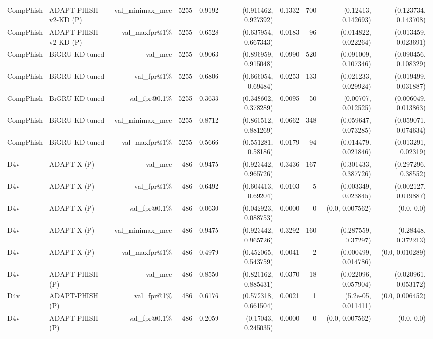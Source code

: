 \begin{table}[t]
\begin{tabular}{llrrrrrrrr}
CompPhish & ADAPT-PHISH v2-KD (P) & val\_minimax\_mcc & 5255 & 0.9192 & (0.910462, 0.927392) & 0.1332 & 700 & (0.12413, 0.142693) & (0.123734, 0.143708) \\
CompPhish & ADAPT-PHISH v2-KD (P) & val\_maxfpr@1\% & 5255 & 0.6528 & (0.637954, 0.667343) & 0.0183 & 96 & (0.014822, 0.022264) & (0.013459, 0.023691) \\
CompPhish & BiGRU-KD tuned & val\_mcc & 5255 & 0.9063 & (0.896959, 0.915048) & 0.0990 & 520 & (0.091009, 0.107346) & (0.090456, 0.108329) \\
CompPhish & BiGRU-KD tuned & val\_fpr@1\% & 5255 & 0.6806 & (0.666054, 0.69484) & 0.0253 & 133 & (0.021233, 0.029924) & (0.019499, 0.031887) \\
CompPhish & BiGRU-KD tuned & val\_fpr@0.1\% & 5255 & 0.3633 & (0.348602, 0.378289) & 0.0095 & 50 & (0.00707, 0.012525) & (0.006049, 0.013863) \\
CompPhish & BiGRU-KD tuned & val\_minimax\_mcc & 5255 & 0.8712 & (0.860512, 0.881269) & 0.0662 & 348 & (0.059647, 0.073285) & (0.059071, 0.074634) \\
CompPhish & BiGRU-KD tuned & val\_maxfpr@1\% & 5255 & 0.5666 & (0.551281, 0.58186) & 0.0179 & 94 & (0.014479, 0.021846) & (0.013291, 0.02319) \\
D4v & ADAPT-X (P) & val\_mcc & 486 & 0.9475 & (0.923442, 0.965726) & 0.3436 & 167 & (0.301433, 0.387726) & (0.297296, 0.38552) \\
D4v & ADAPT-X (P) & val\_fpr@1\% & 486 & 0.6492 & (0.604413, 0.69204) & 0.0103 & 5 & (0.003349, 0.023845) & (0.002127, 0.019887) \\
D4v & ADAPT-X (P) & val\_fpr@0.1\% & 486 & 0.0630 & (0.042923, 0.088753) & 0.0000 & 0 & (0.0, 0.007562) & (0.0, 0.0) \\
D4v & ADAPT-X (P) & val\_minimax\_mcc & 486 & 0.9475 & (0.923442, 0.965726) & 0.3292 & 160 & (0.287559, 0.37297) & (0.28448, 0.372213) \\
D4v & ADAPT-X (P) & val\_maxfpr@1\% & 486 & 0.4979 & (0.452065, 0.543759) & 0.0041 & 2 & (0.000499, 0.014786) & (0.0, 0.010289) \\
D4v & ADAPT-PHISH (P) & val\_mcc & 486 & 0.8550 & (0.820162, 0.885431) & 0.0370 & 18 & (0.022096, 0.057904) & (0.020961, 0.053172) \\
D4v & ADAPT-PHISH (P) & val\_fpr@1\% & 486 & 0.6176 & (0.572318, 0.661504) & 0.0021 & 1 & (5.2e-05, 0.011411) & (0.0, 0.006452) \\
D4v & ADAPT-PHISH (P) & val\_fpr@0.1\% & 486 & 0.2059 & (0.17043, 0.245035) & 0.0000 & 0 & (0.0, 0.007562) & (0.0, 0.0) \\

\end{tabular}
\end{table}
